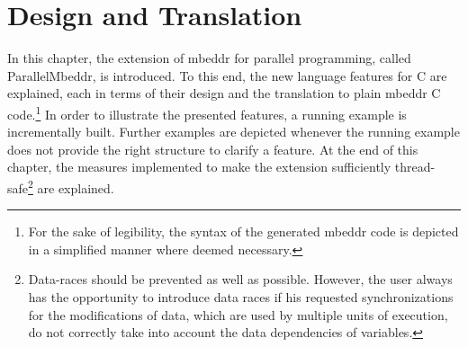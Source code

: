\chapter{Design and Translation}
\label{design_translation}
In this chapter, the extension of mbeddr for parallel programming, called ParallelMbeddr, is introduced. To this end, the new language features for C are explained, each in terms of their design and the translation to plain mbeddr C code.\footnote{For the sake of legibility, the syntax of the generated mbeddr code is depicted in a simplified manner where deemed necessary.} In order to illustrate the presented features, a running example is incrementally built. Further examples are depicted whenever the running example does not provide the right structure to clarify a feature. At the end of this chapter, the measures implemented to make the extension sufficiently thread-safe\footnote{Data-races should be prevented as well as possible. However, the user always has the opportunity to introduce data races if his requested synchronizations for the modifications of data, which are used by multiple units of execution, do not correctly take into account the data dependencies of variables.} are explained.





